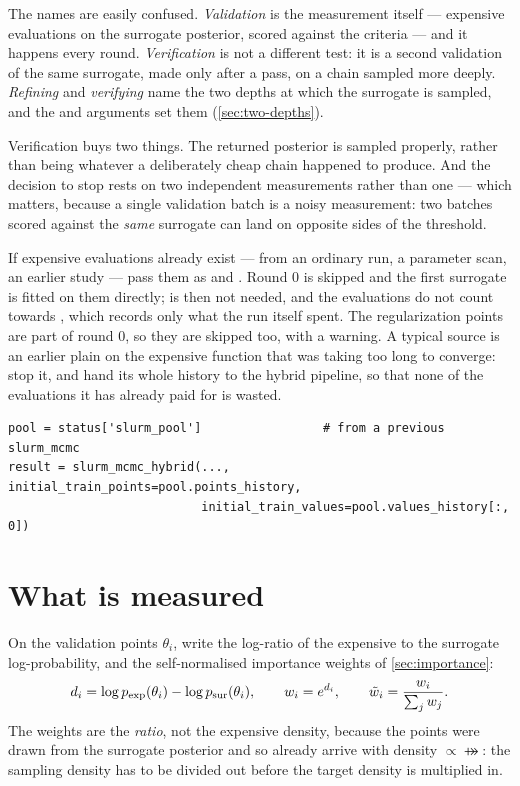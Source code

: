 The names are easily confused. \emph{Validation} is the measurement itself --- expensive
evaluations on the surrogate posterior, scored against the criteria --- and it happens every round.
\emph{Verification} is not a different test: it is a second validation of the same surrogate, made
only after a pass, on a chain sampled more deeply. \emph{Refining} and \emph{verifying} name the two
depths at which the surrogate is sampled, and the  and  arguments set
them (\cref{sec:two-depths}).

Verification buys two things. The returned posterior is sampled properly, rather than being
whatever a deliberately cheap chain happened to produce. And the decision to stop rests on two
independent measurements rather than one --- which matters, because a single validation batch is a
noisy measurement: two batches scored against the \emph{same} surrogate can land on opposite sides of
the threshold.

\begin{keypoint}
If expensive evaluations already exist --- from an ordinary  run, a parameter scan,
an earlier study --- pass them as  and . Round 0
is skipped and the first surrogate is fitted on them directly;  is then not needed,
and the evaluations do not count towards , which records only what the run
itself spent. The regularization points are part of round 0, so they are skipped too, with a warning.
A typical source is an earlier plain  on the expensive function that was taking too
long to converge: stop it, and hand its whole history to the hybrid pipeline, so that none of the
evaluations it has already paid for is wasted.
\begin{lstlisting}
pool = status['slurm_pool']                 # from a previous slurm_mcmc
result = slurm_mcmc_hybrid(..., initial_train_points=pool.points_history,
                           initial_train_values=pool.values_history[:, 0])
\end{lstlisting}
\end{keypoint}

\section{What is measured}
\label{sec:hybrid-measured}

On the validation points $\theta_i$, write the log-ratio of the expensive to the surrogate
log-probability, and the self-normalised importance weights of \cref{sec:importance}:
\begin{equation}
  d_i = \log p_{\mathrm{exp}}(\theta_i) - \log p_{\mathrm{sur}}(\theta_i),
  \qquad w_i = e^{d_i},
  \qquad \tilde w_i = \frac{w_i}{\sum_j w_j}.
\end{equation}
The weights are the \emph{ratio}, not the expensive density, because the points were drawn from the
surrogate posterior and so already arrive with density $\propto \psur$: the sampling density has to
be divided out before the target density is multiplied in.

